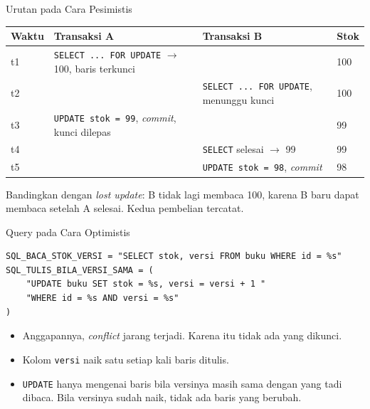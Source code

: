 \documentclass[aspectratio=169, table, 12pt]{beamer}
\begin{document}
\begin{frame}{{\Large Urutan pada Cara Pesimistis}}
  \vspace{5pt}
  {\centering
  {\footnotesize
  \begin{tabularx}{\textwidth}{lYYl}
    \hline
    \textbf{Waktu} & \textbf{Transaksi A} & \textbf{Transaksi B} & \textbf{Stok} \\
    \hline
    t1 & \texttt{SELECT ... FOR UPDATE} $\rightarrow$ 100, baris terkunci & & 100 \\
    \hline
    t2 & & \texttt{SELECT ... FOR UPDATE}, menunggu kunci & 100 \\
    \hline
    t3 & \texttt{UPDATE stok = 99}, \textit{commit}, kunci dilepas & & 99 \\
    \hline
    t4 & & \texttt{SELECT} selesai $\rightarrow$ 99 & 99 \\
    \hline
    t5 & & \texttt{UPDATE stok = 98}, \textit{commit} & 98 \\
    \hline
  \end{tabularx}}\par}

  \vspace{8pt}
  {\footnotesize Bandingkan dengan \textit{lost update}: B tidak lagi membaca
  100, karena B baru dapat membaca setelah A selesai. Kedua pembelian
  tercatat.}
\end{frame}

\begin{frame}[fragile]{{\Large Query pada Cara Optimistis}}
  \vspace{2pt}
\begin{lstlisting}[style=PythonStyle]
SQL_BACA_STOK_VERSI = "SELECT stok, versi FROM buku WHERE id = %s"
SQL_TULIS_BILA_VERSI_SAMA = (
    "UPDATE buku SET stok = %s, versi = versi + 1 "
    "WHERE id = %s AND versi = %s"
)
\end{lstlisting}

  \vspace{4pt}
  \begin{itemize}
    \item Anggapannya, \textit{conflict} jarang terjadi. Karena itu tidak ada
          yang dikunci.
    \item Kolom \texttt{versi} naik satu setiap kali baris ditulis.
    \item \texttt{UPDATE} hanya mengenai baris bila versinya masih sama dengan
          yang tadi dibaca. Bila versinya sudah naik, tidak ada baris yang
          berubah.
  \end{itemize}
\end{frame}
\end{document}
